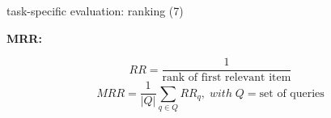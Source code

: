 
\begin{vbframe}{task-specific evaluation: ranking (7)}

\vfill

\textbf{MRR:}

$$RR = \dfrac{1}{\text{rank of first relevant item}}$$
$$MRR = \dfrac{1}{|Q|} \sum_{q \in Q} RR_q,\; with\; Q = \text{set of queries}$$

\vfill

\end{vbframe}


\endlecture

